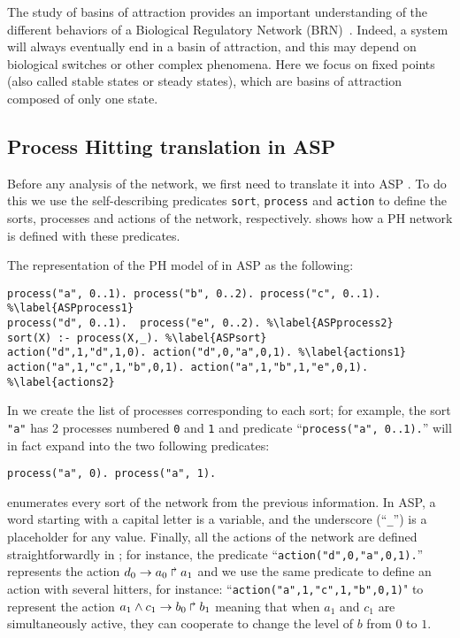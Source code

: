 
The study of basins of attraction provides an important understanding of the different behaviors of a Biological Regulatory Network (BRN)~\cite{wuensche1998genomic}.
Indeed, a system will always eventually end in a basin of attraction,
and this may depend on biological switches or other complex phenomena.
Here we focus on fixed points (also called stable states or steady states),
which are basins of attraction composed of only one state.

\subsection{Process Hitting translation in ASP}
Before any analysis of the network,
we first need to translate it into ASP \benchmarksfootnote.
To do this we use the self-describing predicates
\texttt{sort}, \texttt{process} and \texttt{action} to define the sorts, processes and actions of the network, respectively.
 shows how a PH network is defined with these predicates.

\begin{example}
\label{ex:asp-ph}
The representation of the PH model of  in ASP as the following:
\begin{lstlisting}
process("a", 0..1). process("b", 0..2). process("c", 0..1). %\label{ASPprocess1}
process("d", 0..1).  process("e", 0..2). %\label{ASPprocess2}
sort(X) :- process(X,_). %\label{ASPsort}
action("d",1,"d",1,0). action("d",0,"a",0,1). %\label{actions1}
action("a",1,"c",1,"b",0,1). action("a",1,"b",1,"e",0,1). %\label{actions2}
\end{lstlisting}
In  we create the list of processes corresponding to each sort;
for example, the sort \texttt{"a"} has 2 processes numbered \texttt{0} and \texttt{1} and
predicate ``\texttt{process("a", 0..1).}'' will in fact expand into the two following predicates:
\begin{lstlisting}[numbers=none]
process("a", 0). process("a", 1).
\end{lstlisting}
 enumerates every sort of the network from the previous information.
In ASP, a word starting with a capital letter is a variable,
and the underscore (``\texttt{\_}'') is a placeholder for any value.
Finally, all the actions of the network are defined straightforwardly in ;
for instance, the predicate ``\texttt{action("d",0,"a",0,1).}'' represents the action
$d_0\rightarrow a_0\Rsh a_1$ and we use the same predicate to define an action with several hitters, for instance: ``\texttt{action("a",1,"c",1,"b",0,1)}" to represent the action $a_1 \wedge c_1\rightarrow b_0\Rsh b_1$ meaning that when $a_1$ and $c_1$ are simultaneously active, they can cooperate to change the level of $b$ from $0$ to $1$.
\end{example}

